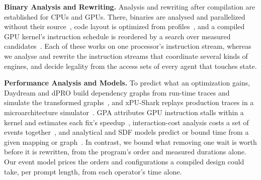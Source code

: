 \textbf{Binary Analysis and Rewriting.}
Analysis and rewriting after compilation are established for CPUs and GPUs.
There, binaries are analysed and parallelized without their source~\citep{kotha2010automatic}, code layout is optimized from profiles~\citep{panchenko2019bolt}, and a compiled GPU kernel's instruction schedule is reordered by a search over measured candidates~\citep{he2025cuasmrl}.
Each of these works on one processor's instruction stream, whereas we analyse and rewrite the instruction streams that coordinate several kinds of engines, and decide legality from the access sets of every agent that touches state.

\textbf{Performance Analysis and Models.}
To predict what an optimization gains, Daydream and dPRO build dependency graphs from run-time traces and simulate the transformed graphs~\citep{zhu2020daydream,hu2022dpro}, and xPU-Shark replays production traces in a microarchitecture simulator~\citep{zarkadas2025xpushark}.
GPA attributes GPU instruction stalls within a kernel and estimates each fix's speedup~\citep{zhou2021gpa}, interaction-cost analysis costs a set of events together~\citep{fields2003interaction}, and analytical and SDF models predict or bound time from a given mapping or graph~\citep{parashar2019timeloop,kwon2019maestro,ghamarian2006throughput}.
In contrast, we bound what removing one wait is worth before it is rewritten, from the program's order and measured durations alone.
Our event model prices the orders and configurations a compiled design could take, per prompt length, from each operator's time alone.

